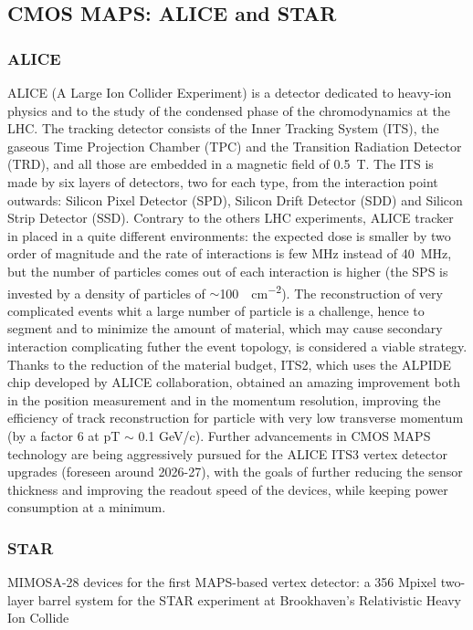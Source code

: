     
    \subsection{CMOS MAPS: ALICE and STAR}
        \subsubsection{ALICE}
        ALICE (A Large Ion Collider Experiment) is a detector dedicated to heavy-ion physics and to the study of the condensed phase of the chromodynamics at the LHC.
        The tracking detector consists of the Inner Tracking System (ITS), the gaseous Time Projection Chamber (TPC) and the Transition Radiation Detector (TRD),  and all those are embedded in a magnetic field of \SI{0.5}{T}. The ITS is made by six layers of detectors, two for each type, from the interaction point outwards: Silicon Pixel Detector (SPD), Silicon Drift Detector (SDD) and Silicon Strip Detector (SSD).         
        Contrary to the others LHC experiments, ALICE tracker in placed in a quite different environments: the expected dose is smaller by two order of magnitude and the rate of interactions is few \si{MHz} instead of \SI{40}{MHz}, but the number of particles comes out of each interaction is higher (the SPS is invested by a density of particles of $\sim$\SI{100}{\per cm\tothe{-2}}).  
        The reconstruction of very complicated events whit a large number of particle is a challenge, hence to segment and to minimize the amount of material, which may cause secondary interaction complicating futher the event topology, is considered a viable strategy. 
        Thanks to the reduction of the material budget, ITS2, which uses the ALPIDE chip developed by ALICE collaboration, obtained an amazing improvement both in the position measurement and in the momentum resolution, improving the efficiency of track reconstruction for particle with very low transverse momentum (by a factor 6 at pT $\sim$ 0.1 GeV/c). Further advancements in CMOS MAPS technology are being aggressively pursued for the ALICE ITS3 vertex detector upgrades (foreseen around 2026-27), with the goals of further reducing the sensor thickness and improving the readout speed of the devices, while keeping power consumption at a minimum.\\
        
        \subsubsection{STAR}
        MIMOSA-28 devices for the first MAPS-based vertex detector: a 356 Mpixel two-layer barrel system for the STAR experiment at Brookhaven’s Relativistic Heavy Ion Collide

